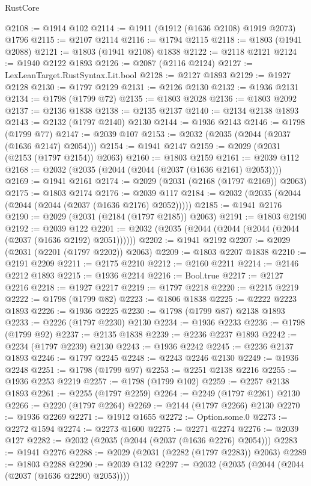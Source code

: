 \begin{lexlean}{RustCore}
\begin{coremodule}
@2108 := @1914 @102
@2114 := @1911 (@1912 (@1636 @2108) @1919 @2073) @1796
@2115 := @2107 @2114
@2116 := @1794 @2115
@2118 := @1803 (@1941 @2088)
@2121 := @1803 (@1941 @2108) @1838
@2122 := @2118 @2121
@2124 := @1940 @2122 @1893
@2126 := @2087 (@2116 @2124)
@2127 := LexLeanTarget.RustSyntax.Lit.bool
@2128 := @2127 @1893
@2129 := @1927 @2128
@2130 := @1797 @2129
@2131 := @2126 @2130
@2132 := @1936 @2131
@2134 := @1798 (@1799 @72)
@2135 := @1803 @2028
@2136 := @1803 @2092
@2137 := @2136 @1838
@2138 := @2135 @2137
@2140 := @2134 @2138 @1893
@2143 := @2132 (@1797 @2140) @2130
@2144 := @1936 @2143
@2146 := @1798 (@1799 @77)
@2147 := @2039 @107
@2153 := @2032 (@2035 (@2044 (@2037 (@1636 @2147) @2054)))
@2154 := @1941 @2147
@2159 := @2029 (@2031 (@2153 (@1797 @2154)) @2063)
@2160 := @1803 @2159
@2161 := @2039 @112
@2168 := @2032 (@2035 (@2044 (@2044 (@2037 (@1636 @2161) @2053))))
@2169 := @1941 @2161
@2174 := @2029 (@2031 (@2168 (@1797 @2169)) @2063)
@2175 := @1803 @2174
@2176 := @2039 @117
@2184 := @2032 (@2035 (@2044 (@2044 (@2044 (@2037 (@1636 @2176) @2052)))))
@2185 := @1941 @2176
@2190 := @2029 (@2031 (@2184 (@1797 @2185)) @2063)
@2191 := @1803 @2190
@2192 := @2039 @122
@2201 := @2032 (@2035 (@2044 (@2044 (@2044 (@2044 (@2037 (@1636 @2192) @2051))))))
@2202 := @1941 @2192
@2207 := @2029 (@2031 (@2201 (@1797 @2202)) @2063)
@2209 := @1803 @2207 @1838
@2210 := @2191 @2209
@2211 := @2175 @2210
@2212 := @2160 @2211
@2214 := @2146 @2212 @1893
@2215 := @1936 @2214
@2216 := Bool.true
@2217 := @2127 @2216
@2218 := @1927 @2217
@2219 := @1797 @2218
@2220 := @2215 @2219
@2222 := @1798 (@1799 @82)
@2223 := @1806 @1838
@2225 := @2222 @2223 @1893
@2226 := @1936 @2225
@2230 := @1798 (@1799 @87) @2138 @1893
@2233 := @2226 (@1797 @2230) @2130
@2234 := @1936 @2233
@2236 := @1798 (@1799 @92)
@2237 := @2135 @1838
@2239 := @2236 @2237 @1893
@2242 := @2234 (@1797 @2239) @2130
@2243 := @1936 @2242
@2245 := @2236 @2137 @1893
@2246 := @1797 @2245
@2248 := @2243 @2246 @2130
@2249 := @1936 @2248
@2251 := @1798 (@1799 @97)
@2253 := @2251 @2138 @2216
@2255 := @1936 @2253 @2219
@2257 := @1798 (@1799 @102)
@2259 := @2257 @2138 @1893
@2261 := @2255 (@1797 @2259)
@2264 := @2249 (@1797 @2261) @2130
@2266 := @2220 (@1797 @2264)
@2269 := @2144 (@1797 @2266) @2130
@2270 := @1936 @2269
@2271 := @1912 @1655
@2272 := Option.some.{0}
@2273 := @2272 @1594
@2274 := @2273 @1600
@2275 := @2271 @2274
@2276 := @2039 @127
@2282 := @2032 (@2035 (@2044 (@2037 (@1636 @2276) @2054)))
@2283 := @1941 @2276
@2288 := @2029 (@2031 (@2282 (@1797 @2283)) @2063)
@2289 := @1803 @2288
@2290 := @2039 @132
@2297 := @2032 (@2035 (@2044 (@2044 (@2037 (@1636 @2290) @2053))))

\end{coremodule}
\end{lexlean}

